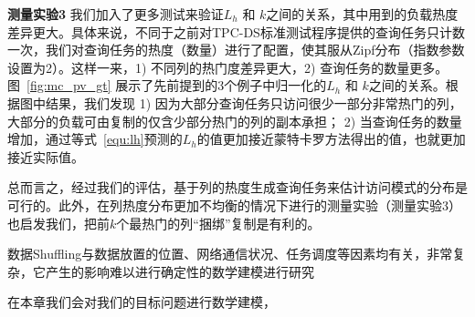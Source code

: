 \par \noindent\textbf{测量实验3} 我们加入了更多测试来验证$L_h$ 和 $k$之间的关系，其中用到的负载热度差异更大。具体来说，不同于之前对TPC-DS标准测试程序提供的查询任务只计数一次，我们对查询任务的热度（数量）进行了配置，使其服从Zipf分布（指数参数设置为2）。这样一来，1) 不同列的热门度差异更大，2) 查询任务的数量更多。图~\ref{fig:mc_pv_gt} 展示了先前提到的3个例子中归一化的$L_h$ 和 $k$之间的关系。根据图中结果，我们发现 1) 因为大部分查询任务只访问很少一部分非常热门的列，大部分的负载可由复制的仅含少部分热门的列的副本承担； 2) 当查询任务的数量增加，通过等式~\ref{equ:lh}预测的$L_h$的值更加接近蒙特卡罗方法得出的值，也就更加接近实际值。


\par 总而言之，经过我们的评估，基于列的热度生成查询任务来估计访问模式的分布是可行的。此外，在列热度分布更加不均衡的情况下进行的测量实验（测量实验3）也启发我们，把前$k$个最热门的列“捆绑”复制是有利的。

数据Shuffling与数据放置的位置、网络通信状况、任务调度等因素均有关，非常复杂，它产生的影响难以进行确定性的数学建模进行研究
\par 在本章我们会对我们的目标问题进行数学建模，

